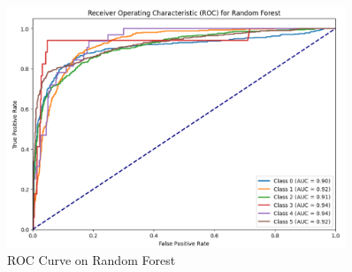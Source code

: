 \begin{figure}[h!]  
    \centering
    \includegraphics[width=0.9\textwidth]{Images/ROC RF.png}  
    \caption{ROC Curve on Random Forest}
    \label{ROC RF}  %
\end{figure}



